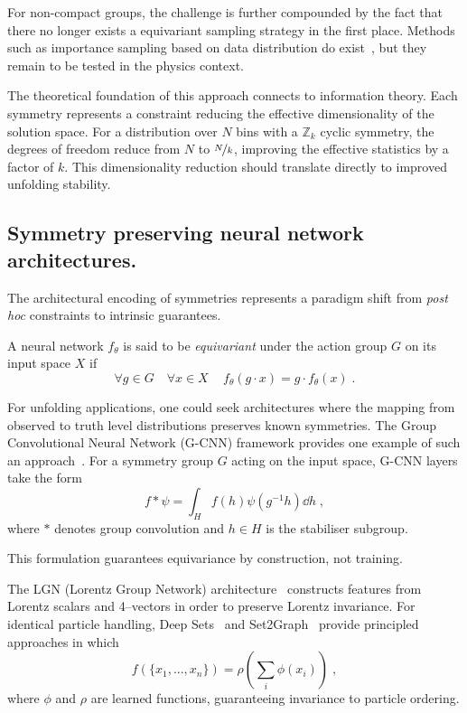     For non-compact groups, the challenge is further compounded by the fact that there no longer exists a equivariant sampling strategy in the first place.
    Methods such as importance sampling based on data distribution do exist~\cite{goertzel_quota_1949}, but they remain to be tested in the physics context.
    
    The theoretical foundation of this approach connects to information theory.
    Each symmetry represents a constraint reducing the effective dimensionality of the solution space.
    For a distribution over \(N\) bins with a \(\mathbb{Z}_k\) cyclic symmetry, the degrees of freedom reduce from \(N\) to \(\nicefrac Nk\), improving the effective statistics by a factor of \(k\).
    This dimensionality reduction should translate directly to improved unfolding stability.

    \subsection{Symmetry preserving neural network architectures.}
        The architectural encoding of symmetries represents a paradigm shift from \textit{post hoc} constraints to intrinsic guarantees.
        \begin{definition}
        A neural network \(f_\theta\) is said to be \textit{equivariant} under the action group \(G\) on its input space \(X\) if
        \[
            \forall g\in G\quad\forall x\in X\quad\,f_\theta(g \cdot x) = g \cdot f_\theta(x)\;.
        \]
        \end{definition}
        For unfolding applications, one could seek architectures where the mapping from observed to truth level distributions preserves known symmetries.
        The Group Convolutional Neural Network (G-CNN) framework provides one example of such an approach~\cite{Cohen:2016wkb}.
        For a symmetry group \(G\) acting on the input space, G-CNN layers take the form
        \[
            f * \psi = \int_H f(h)\psi(g^{-1}h) \dd h\;,
        \]
        where \(*\) denotes group convolution and \(h\in H\) is the stabiliser subgroup.
        
        This formulation guarantees equivariance by construction, not training.

        The LGN (Lorentz Group Network) architecture~\cite{Bogatskiy:2020tje} constructs features from Lorentz scalars and 4--vectors in order to preserve Lorentz invariance.
        For identical particle handling, Deep Sets~\cite{Zaheer:2017wmg} and Set2Graph~\cite{Serviansky:2020qwa} provide principled approaches in which
        \[
            f(\{x_1, ..., x_n\}) = \rho\left(\sum_i \phi(x_i)\right)\;,
        \]
        where \(\phi\) and \(\rho\) are learned functions, guaranteeing invariance to particle ordering.
        
